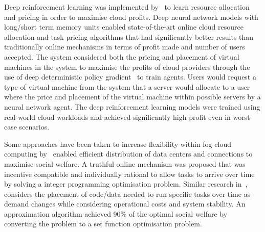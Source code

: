 Deep reinforcement learning was implemented by~\cite{Du2019} to learn resource allocation and pricing in order to
maximise cloud profits. Deep neural network models with long/short term memory units enabled state-of-the-art online
cloud resource allocation and task pricing algorithms that had significantly better results than traditionally
online mechanisms in terms of profit made and number of users accepted. The system considered both the pricing and
placement of virtual machines in the system to maximise the profits of cloud providers through the use of deep
deterministic policy gradient~\citep{ddpg} to train agents. Users would request a type of virtual machine from the
system that a server would allocate to a user where the price and placement of the virtual machine within possible
servers by a neural network agent. The deep reinforcement learning models were trained using real-world cloud workloads
and achieved significantly high profit even in worst-case scenarios.

Some approaches have been taken to increase flexibility within fog cloud computing by~\cite{Bi2019} enabled efficient
distribution of data centers and connections to maximise social welfare. A truthful online mechanism was
proposed that was incentive compatible and individually rational to allow tasks to arrive over time by solving a
integer programming optimisation problem. Similar research in~\cite{vaji_infocom}, considers the placement of code/data
needed to run specific tasks over time as demand changes while considering operational costs and system stability.
An approximation algorithm achieved 90\% of the optimal social welfare by converting the problem to a set function
optimisation problem.

